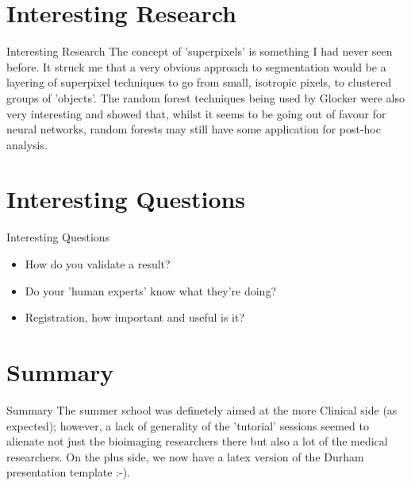 \documentclass[11pt]{beamer}
\begin{document}
\section{Interesting Research}
\begin{frame}{Interesting Research}
	The concept of 'superpixels' is something I had never seen before. It struck me that a very obvious approach to segmentation would be a layering of superpixel techniques to go from small, isotropic pixels, to clustered groups of 'objects'.
	The random forest techniques being used by Glocker were also very interesting and showed that, whilst it seems to be going out of favour for neural networks, random forests may still have some application for post-hoc analysis.
\end{frame}

\section{Interesting Questions}
\begin{frame}{Interesting Questions}
	\begin{itemize}
	\item How do you validate a result?
	\item Do your 'human experts' know what they're doing?
	\item Registration, how important and useful is it?
	\end{itemize}
\end{frame}

\section{Summary}
\begin{frame}{Summary}
	The summer school was definetely aimed at the more Clinical side (as expected); however, a lack of generality of the 'tutorial' sessions seemed to alienate not just the bioimaging researchers there but also a lot of the medical researchers. On the plus side, we now have a latex version of the Durham presentation template :-).
\end{frame}
\end{document}
